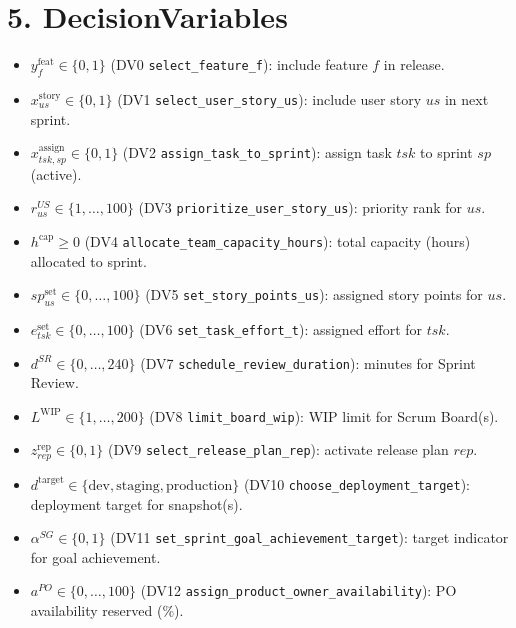 \documentclass[11pt,a4paper]{article}
\begin{document}
\section{5. DecisionVariables}
\begin{itemize}[leftmargin=2em]
  \item $y^{\text{feat}}_{f} \in \{0,1\}$ (DV0 \texttt{select\_feature\_f}): include feature $f$ in release.
  \item $x^{\text{story}}_{us} \in \{0,1\}$ (DV1 \texttt{select\_user\_story\_us}): include user story $us$ in next sprint.
  \item $x^{\text{assign}}_{tsk,sp} \in \{0,1\}$ (DV2 \texttt{assign\_task\_to\_sprint}): assign task $tsk$ to sprint $sp$ (active).
  \item $r^{US}_{us} \in \{1,\dots,100\}$ (DV3 \texttt{prioritize\_user\_story\_us}): priority rank for $us$.
  \item $h^{\text{cap}} \ge 0$ (DV4 \texttt{allocate\_team\_capacity\_hours}): total capacity (hours) allocated to sprint.
  \item $sp^{\text{set}}_{us} \in \{0,\dots,100\}$ (DV5 \texttt{set\_story\_points\_us}): assigned story points for $us$.
  \item $e^{\text{set}}_{tsk} \in \{0,\dots,100\}$ (DV6 \texttt{set\_task\_effort\_t}): assigned effort for $tsk$.
  \item $d^{SR} \in \{0,\dots,240\}$ (DV7 \texttt{schedule\_review\_duration}): minutes for Sprint Review.
  \item $L^{\text{WIP}} \in \{1,\dots,200\}$ (DV8 \texttt{limit\_board\_wip}): WIP limit for Scrum Board(s).
  \item $z^{\text{rep}}_{rep} \in \{0,1\}$ (DV9 \texttt{select\_release\_plan\_rep}): activate release plan $rep$.
  \item $d^{\text{target}} \in \{\text{dev},\text{staging},\text{production}\}$ (DV10 \texttt{choose\_deployment\_target}): deployment target for snapshot(s).
  \item $\alpha^{SG} \in \{0,1\}$ (DV11 \texttt{set\_sprint\_goal\_achievement\_target}): target indicator for goal achievement.
  \item $a^{PO} \in \{0,\dots,100\}$ (DV12 \texttt{assign\_product\_owner\_availability}): PO availability reserved (\%).
\end{itemize}
\end{document}
